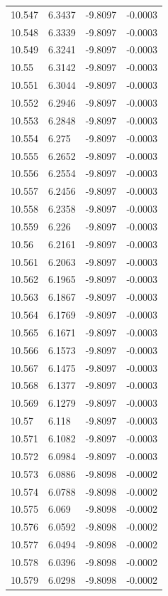 \begin{tabular}{llll}
10.547 & 6.3437 & -9.8097 & -0.0003 \\
10.548 & 6.3339 & -9.8097 & -0.0003 \\
10.549 & 6.3241 & -9.8097 & -0.0003 \\
10.55 & 6.3142 & -9.8097 & -0.0003 \\
10.551 & 6.3044 & -9.8097 & -0.0003 \\
10.552 & 6.2946 & -9.8097 & -0.0003 \\
10.553 & 6.2848 & -9.8097 & -0.0003 \\
10.554 & 6.275 & -9.8097 & -0.0003 \\
10.555 & 6.2652 & -9.8097 & -0.0003 \\
10.556 & 6.2554 & -9.8097 & -0.0003 \\
10.557 & 6.2456 & -9.8097 & -0.0003 \\
10.558 & 6.2358 & -9.8097 & -0.0003 \\
10.559 & 6.226 & -9.8097 & -0.0003 \\
10.56 & 6.2161 & -9.8097 & -0.0003 \\
10.561 & 6.2063 & -9.8097 & -0.0003 \\
10.562 & 6.1965 & -9.8097 & -0.0003 \\
10.563 & 6.1867 & -9.8097 & -0.0003 \\
10.564 & 6.1769 & -9.8097 & -0.0003 \\
10.565 & 6.1671 & -9.8097 & -0.0003 \\
10.566 & 6.1573 & -9.8097 & -0.0003 \\
10.567 & 6.1475 & -9.8097 & -0.0003 \\
10.568 & 6.1377 & -9.8097 & -0.0003 \\
10.569 & 6.1279 & -9.8097 & -0.0003 \\
10.57 & 6.118 & -9.8097 & -0.0003 \\
10.571 & 6.1082 & -9.8097 & -0.0003 \\
10.572 & 6.0984 & -9.8097 & -0.0003 \\
10.573 & 6.0886 & -9.8098 & -0.0002 \\
10.574 & 6.0788 & -9.8098 & -0.0002 \\
10.575 & 6.069 & -9.8098 & -0.0002 \\
10.576 & 6.0592 & -9.8098 & -0.0002 \\
10.577 & 6.0494 & -9.8098 & -0.0002 \\
10.578 & 6.0396 & -9.8098 & -0.0002 \\
10.579 & 6.0298 & -9.8098 & -0.0002 \\

\end{tabular}
